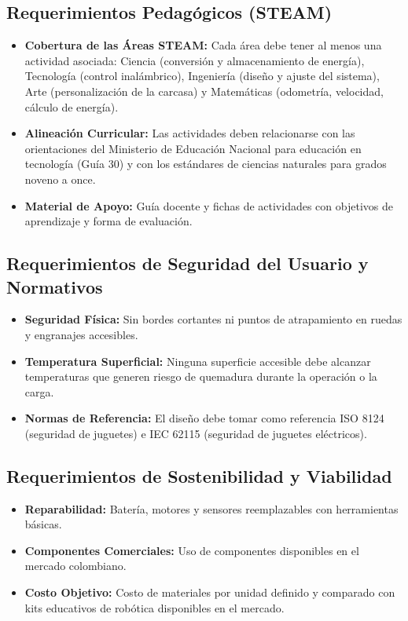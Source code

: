 \documentclass[11pt]{article}
\begin{document}
\subsection{Requerimientos Pedagógicos (STEAM) }
\begin{itemize}
  \item \textbf{Cobertura de las Áreas STEAM:} Cada área debe tener al menos una actividad asociada: Ciencia (conversión y almacenamiento de energía), Tecnología (control inalámbrico), Ingeniería (diseño y ajuste del sistema), Arte (personalización de la carcasa) y Matemáticas (odometría, velocidad, cálculo de energía).
  \item \textbf{Alineación Curricular:} Las actividades deben relacionarse con las orientaciones del Ministerio de Educación Nacional para educación en tecnología (Guía 30) y con los estándares de ciencias naturales para grados noveno a once.
  \item \textbf{Material de Apoyo:} Guía docente y fichas de actividades con objetivos de aprendizaje y forma de evaluación.
\end{itemize}
 

\subsection{Requerimientos de Seguridad del Usuario y Normativos }
\begin{itemize}
  \item \textbf{Seguridad Física:} Sin bordes cortantes ni puntos de atrapamiento en ruedas y engranajes accesibles.
  \item \textbf{Temperatura Superficial:} Ninguna superficie accesible debe alcanzar temperaturas que generen riesgo de quemadura durante la operación o la carga.
  \item \textbf{Normas de Referencia:} El diseño debe tomar como referencia ISO 8124 (seguridad de juguetes) e IEC 62115 (seguridad de juguetes eléctricos).
\end{itemize}

\subsection{Requerimientos de Sostenibilidad y Viabilidad }
\begin{itemize}
  \item \textbf{Reparabilidad:} Batería, motores y sensores reemplazables con herramientas básicas.
  \item \textbf{Componentes Comerciales:} Uso de componentes disponibles en el mercado colombiano.
  \item \textbf{Costo Objetivo:} Costo de materiales por unidad definido y comparado con kits educativos de robótica disponibles en el mercado.
\end{itemize}
\end{document}
